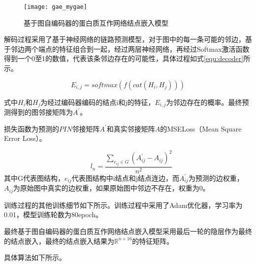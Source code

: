 \begin{figure}[htbp]
    \centering
    \texttt{[image: gae\_mygae]}
    \caption{基于图自编码器的蛋白质互作网络结点嵌入模型}
    \label{fig:gae_mygae}
\end{figure}

解码过程采用了基于神经网络的链路预测模型，对于图中的每一条可能的邻边，基于邻边两个端点的特征组合到一起，经过两层神经网络，再经过Softmax激活函数得到一个0至1的数值，代表该条邻边存在的可能性，具体过程如式\ref{equ:decoder}所示。

\begin{equation}
    \label{equ:decoder}
    E_{i,j} =softmax(f(cat(H_i,H_j)))
\end{equation}

式中$H_i$和$H_j$为经过编码器编码的结点i和j的特征，$E_{i,j}$为邻边存在的概率。最终预测得到的图邻接矩阵为$A^{\prime}$。


损失函数为预测的$PIN$邻接矩阵$A^{\prime}$和真实邻接矩阵$A$的MSELoss（Mean Square Error Loss）。

\begin{equation}
    \label{equ:autoembedloss}
    \quad l_n =\frac{\sum_{e_{ij}\in G}{  \left( A_{ij}^{\prime} - A_{ij} \right)^2}}{n^2}
\end{equation}
其中G代表图结构，$e_{ij}$代表图结构中i结点和j结点连边，而$A_{ij}^{\prime}$为预测的边权重，$A_{ij}$为原始图中真实的边权重，如果原始图中邻边不存在，权重为0。


训练过程的其他训练细节如下所示。训练过程中采用了Adam优化器，学习率为0.01，模型训练轮数为80epoch。

最终基于图自编码器的蛋白质互作网络结点嵌入模型采用最后一轮的隐层作为最终的结点嵌入，最终的结点嵌入结果为$\mathbb{R}^{n\times 16}$的特征矩阵。

具体算法如下所示。

